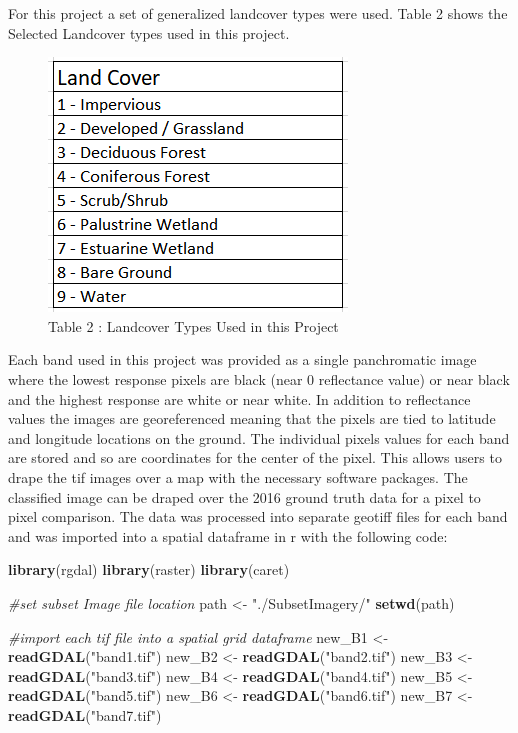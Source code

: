 \documentclass[]{article}
\newenvironment{Shaded}{\begin{snugshade}}{\end{snugshade}}
\newcommand{\KeywordTok}[1]{\textcolor[rgb]{0.13,0.29,0.53}{\textbf{#1}}}
\newcommand{\StringTok}[1]{\textcolor[rgb]{0.31,0.60,0.02}{#1}}
\newcommand{\CommentTok}[1]{\textcolor[rgb]{0.56,0.35,0.01}{\textit{#1}}}
\newcommand{\NormalTok}[1]{#1}
\begin{document}
For this project a set of generalized landcover types were used. Table 2
shows the Selected Landcover types used in this project.

\begin{figure}
\centering
\includegraphics{images/Table2.png}
\caption{Table 2 : Landcover Types Used in this Project}
\end{figure}

Each band used in this project was provided as a single panchromatic
image where the lowest response pixels are black (near 0 reflectance
value) or near black and the highest response are white or near white.
In addition to reflectance values the images are georeferenced meaning
that the pixels are tied to latitude and longitude locations on the
ground. The individual pixels values for each band are stored and so are
coordinates for the center of the pixel. This allows users to drape the
tif images over a map with the necessary software packages. The
classified image can be draped over the 2016 ground truth data for a
pixel to pixel comparison. The data was processed into separate geotiff
files for each band and was imported into a spatial dataframe in r with
the following code:

\begin{Shaded}
\begin{Highlighting}[]
\KeywordTok{library}\NormalTok{(rgdal)}
\KeywordTok{library}\NormalTok{(raster)}
\KeywordTok{library}\NormalTok{(caret)}

\CommentTok{#set subset Image file location}
\NormalTok{path <-}\StringTok{ "./SubsetImagery/"}
\KeywordTok{setwd}\NormalTok{(path)}

\CommentTok{#import each tif file into a spatial grid dataframe}
\NormalTok{new_B1 <-}\StringTok{ }\KeywordTok{readGDAL}\NormalTok{(}\StringTok{"band1.tif"}\NormalTok{)}
\NormalTok{new_B2 <-}\StringTok{ }\KeywordTok{readGDAL}\NormalTok{(}\StringTok{"band2.tif"}\NormalTok{)}
\NormalTok{new_B3 <-}\StringTok{ }\KeywordTok{readGDAL}\NormalTok{(}\StringTok{"band3.tif"}\NormalTok{)}
\NormalTok{new_B4 <-}\StringTok{ }\KeywordTok{readGDAL}\NormalTok{(}\StringTok{"band4.tif"}\NormalTok{)}
\NormalTok{new_B5 <-}\StringTok{ }\KeywordTok{readGDAL}\NormalTok{(}\StringTok{"band5.tif"}\NormalTok{)}
\NormalTok{new_B6 <-}\StringTok{ }\KeywordTok{readGDAL}\NormalTok{(}\StringTok{"band6.tif"}\NormalTok{)}
\NormalTok{new_B7 <-}\StringTok{ }\KeywordTok{readGDAL}\NormalTok{(}\StringTok{"band7.tif"}\NormalTok{)}
\end{Highlighting}
\end{Shaded}
\end{document}
